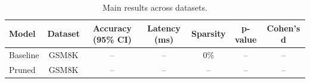 \begin{table}[t]
\centering
\caption{Main results across datasets.}
\begin{tabular}{lcccccc}
\toprule
Model & Dataset & Accuracy (95\% CI) & Latency (ms) & Sparsity & p-value & Cohen's d \\
\midrule
Baseline & GSM8K & -- & -- & 0\% & -- & -- \\
Pruned & GSM8K & -- & -- & -- & -- & -- \\
\bottomrule
\end{tabular}
\end{table}
